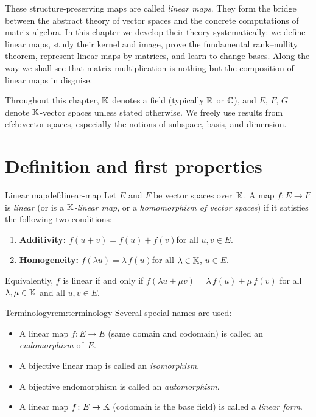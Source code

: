 These structure-preserving maps are called \emph{linear maps}. They form
the bridge between the abstract theory of vector spaces and the concrete
computations of matrix algebra. In this chapter we develop their theory
systematically: we define linear maps, study their kernel and image,
prove the fundamental rank--nullity theorem, represent linear maps by
matrices, and learn to change bases. Along the way we shall see that
matrix multiplication is nothing but the composition of linear maps in
disguise.

Throughout this chapter, ${\mathbb{K}}$ denotes a field (typically ${\mathbb{R}}$ or ${\mathbb{C}}$),
and $E$, $F$, $G$ denote ${\mathbb{K}}$-vector spaces unless stated otherwise.
We freely use results from 
ef{ch:vector-spaces}, especially the
notions of subspace, basis, and dimension.


\section{Definition and first properties}\label{sec:linear-map-def}

\begin{definition}{Linear map}{def:linear-map}
Let $E$ and $F$ be vector spaces over~${\mathbb{K}}$. A map
$f\colon E \to F$ is \emph{linear} (or is a \emph{${\mathbb{K}}$-linear map},
or a \emph{homomorphism of vector spaces}) if it satisfies the
following two conditions:
\begin{enumerate}[label=(\roman*)]
  \item \textbf{Additivity:}
    $f(u+v) = f(u) + f(v)$\quad for all $u,v\in E$.
  \item \textbf{Homogeneity:}
    $f(\lambda u) = \lambda\, f(u)$\quad for all $\lambda\in{\mathbb{K}}$,
    $u\in E$.
\end{enumerate}
Equivalently, $f$ is linear if and only if
$f(\lambda u + \mu v) = \lambda\, f(u) + \mu\, f(v)$
for all $\lambda,\mu\in{\mathbb{K}}$ and all $u,v\in E$.
\end{definition}

\begin{remark}{Terminology}{rem:terminology}
Several special names are used:
\begin{itemize}
  \item A linear map $f\colon E\to E$ (same domain and codomain) is
    called an \emph{endomorphism} of~$E$.
  \item A bijective linear map is called an \emph{isomorphism}.
  \item A bijective endomorphism is called an \emph{automorphism}.
  \item A linear map $f\colon E\to{\mathbb{K}}$ (codomain is the base field)
    is called a \emph{linear form}.
\end{itemize}
\end{remark}

